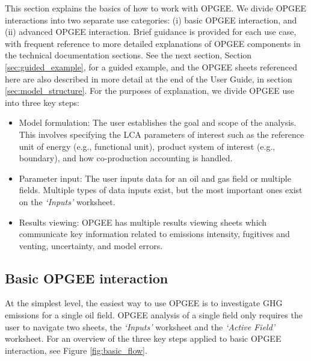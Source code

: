 \documentclass[11pt]{report}
\newcommand{\sheet}[1]{\textit{`{#1}'}}
\begin{document}
This section explains the basics of how to work with OPGEE. We divide OPGEE interactions into two separate use categories: (i) basic OPGEE interaction, and (ii) advanced OPGEE interaction. Brief guidance is provided for each use case, with frequent reference to more detailed explanations of OPGEE components in the technical documentation sections. See the next section, Section \ref{sec:guided_example}, for a guided example, and the OPGEE sheets referenced here are also described in more detail at the end of the User Guide, in section \ref{sec:model_structure}.
For the purposes of explanation, we divide OPGEE use into three key steps:


\begin{itemize}
\item Model formulation: The user establishes the goal and scope of the analysis. This involves specifying the LCA parameters of interest such as the reference unit of energy (e.g., functional unit), product system of interest (e.g., boundary), and how co-production accounting is handled.
\item Parameter input: The user inputs data for an oil and gas field or multiple fields. Multiple types of data inputs exist, but the most important ones exist on the \sheet{Inputs} worksheet.
\item Results viewing: OPGEE has multiple results viewing sheets which communicate key information related to emissions intensity, fugitives and venting, uncertainty, and model errors.
\end{itemize}
\subsection{Basic OPGEE interaction} 

At the simplest level, the easiest way to use OPGEE is to investigate GHG emissions for a single oil field. OPGEE analysis of a single field only requires the user to navigate two sheets, the \sheet{Inputs} worksheet and the \sheet{Active Field} worksheet. For an overview of the three key steps applied to basic OPGEE interaction, see Figure \ref{fig:basic_flow}.

\clearpage
\end{document}
